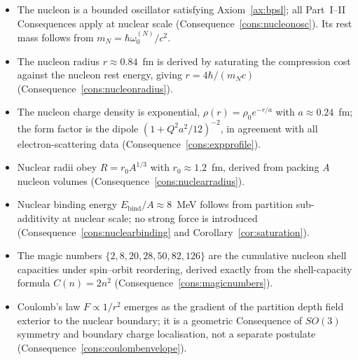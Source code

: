 \bigskip
\begin{tcolorbox}[colback=crownblue!5, colframe=crownblue!60!black,
                  title={\textbf{Chapter 11 Summary}}]
\begin{itemize}[noitemsep]
  \item The nucleon is a bounded oscillator satisfying Axiom~\ref{ax:bpsl}; all
    Part~I--II Consequences apply at nuclear scale
    (Consequence~\ref{cons:nucleonosc}).  Its rest mass follows from
    $m_{N}=\hbar\omega_{0}^{(N)}/c^{2}$.

  \item The nucleon radius $r\approx 0.84$~fm is derived by saturating the
    compression cost against the nucleon rest energy, giving $r=4\hbar/(m_{N}c)$
    (Consequence~\ref{cons:nucleonradius}).

  \item The nucleon charge density is exponential, $\rho(r)=\rho_{0}e^{-r/a}$
    with $a\approx 0.24$~fm; the form factor is the dipole
    $(1+Q^{2}a^{2}/12)^{-2}$, in agreement with all electron-scattering data
    (Consequence~\ref{cons:expprofile}).

  \item Nuclear radii obey $R=r_{0}A^{1/3}$ with $r_{0}\approx 1.2$~fm,
    derived from packing $A$ nucleon volumes
    (Consequence~\ref{cons:nuclearradius}).

  \item Nuclear binding energy $E_{\mathrm{bind}}/A\approx 8$~MeV follows from
    partition sub-additivity at nuclear scale; no strong force is introduced
    (Consequence~\ref{cons:nuclearbinding} and Corollary~\ref{cor:saturation}).

  \item The magic numbers $\{2,8,20,28,50,82,126\}$ are the cumulative nucleon
    shell capacities under spin--orbit reordering, derived exactly from the
    shell-capacity formula $C(n)=2n^{2}$
    (Consequence~\ref{cons:magicnumbers}).

  \item Coulomb's law $F\propto 1/r^{2}$ emerges as the gradient of the
    partition depth field exterior to the nuclear boundary; it is a geometric
    Consequence of $SO(3)$ symmetry and boundary charge localisation, not a
    separate postulate (Consequence~\ref{cons:coulombenvelope}).
\end{itemize}
\end{tcolorbox}
